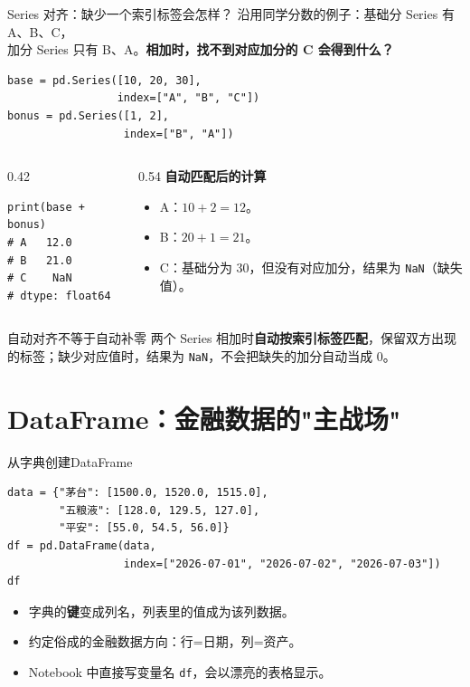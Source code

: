 \documentclass[9pt]{ctexbeamer}
\begin{document}
\begin{frame}[fragile]{Series 对齐：缺少一个索引标签会怎样？}
\small
沿用同学分数的例子：基础分 Series 有 A、B、C，\\
加分 Series 只有 B、A。\textbf{相加时，找不到对应加分的 C 会得到什么？}
\begin{lstlisting}
base = pd.Series([10, 20, 30],
                 index=["A", "B", "C"])
bonus = pd.Series([1, 2],
                  index=["B", "A"])
\end{lstlisting}
\begin{columns}[T]
\begin{column}{0.42\textwidth}
\begin{lstlisting}
print(base + bonus)
# A   12.0
# B   21.0
# C    NaN
# dtype: float64
\end{lstlisting}
\end{column}
\begin{column}{0.54\textwidth}
\textbf{自动匹配后的计算}
\begin{itemize}
\item A：$10+2=12$。
\item B：$20+1=21$。
\item C：基础分为 30，但没有对应加分，结果为 \texttt{NaN}（缺失值）。
\end{itemize}
\end{column}
\end{columns}
\begin{alertblock}{自动对齐不等于自动补零}
两个 Series 相加时\textbf{自动按索引标签匹配}，保留双方出现的标签；缺少对应值时，结果为 \texttt{NaN}，不会把缺失的加分自动当成 0。
\end{alertblock}
\end{frame}

\section{DataFrame：金融数据的"主战场"}

\begin{frame}[fragile]{从字典创建DataFrame}
	\begin{lstlisting}
data = {"茅台": [1500.0, 1520.0, 1515.0],
        "五粮液": [128.0, 129.5, 127.0],
        "平安": [55.0, 54.5, 56.0]}
df = pd.DataFrame(data,
                  index=["2026-07-01", "2026-07-02", "2026-07-03"])
df
\end{lstlisting}
	\begin{itemize}
		\item 字典的\textbf{键}变成列名，列表里的值成为该列数据。
		\item 约定俗成的金融数据方向：\alert{行=日期，列=资产}。
		\item Notebook 中直接写变量名 \texttt{df}，会以漂亮的表格显示。
	\end{itemize}
\end{frame}
\end{document}
